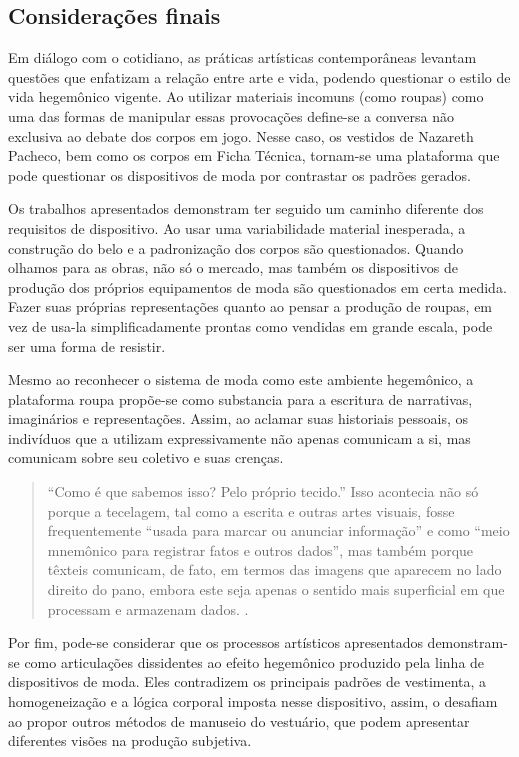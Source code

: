 \begin{refsection}
    \section{Considerações finais}

    Em diálogo com o cotidiano, as práticas artísticas contemporâneas levantam questões que enfatizam a relação entre arte e vida, podendo questionar o estilo de vida hegemônico vigente. Ao utilizar materiais incomuns (como roupas) como uma das formas de manipular essas provocações define-se a conversa não exclusiva ao debate dos corpos em jogo. Nesse caso, os vestidos de Nazareth Pacheco, bem como os corpos em Ficha Técnica, tornam-se uma plataforma que pode questionar os dispositivos de moda por contrastar os padrões gerados. 

    Os trabalhos apresentados demonstram ter seguido um caminho diferente dos requisitos de dispositivo. Ao usar uma variabilidade material inesperada, a construção do belo e a padronização dos corpos são questionados. Quando olhamos para as obras, não só o mercado, mas também os dispositivos de produção dos próprios equipamentos de moda são questionados em certa medida. Fazer suas próprias representações quanto ao pensar a produção de roupas, em vez de usa-la simplificadamente prontas como vendidas em grande escala, pode ser uma forma de resistir.  

    Mesmo ao reconhecer o sistema de moda como este ambiente hegemônico, a plataforma roupa propõe-se como substancia para a escritura de narrativas, imaginários e representações. Assim, ao aclamar suas historiais pessoais, os indivíduos que a utilizam expressivamente não apenas comunicam a si, mas comunicam sobre seu coletivo e suas crenças. 

    \begin{quotation}
        ``Como é que sabemos isso? Pelo próprio tecido.'' Isso acontecia não só porque a tecelagem, tal como a escrita e outras artes visuais, fosse frequentemente ``usada para marcar ou anunciar informação'' e como ``meio mnemônico para registrar fatos e outros dados'', mas também porque têxteis comunicam, de fato, em termos das imagens que aparecem no lado direito do pano, embora este seja apenas o sentido mais superficial em que processam e armazenam dados. \cite[p.~29]{Rago2013Aventura}.
    \end{quotation}

    Por fim, pode-se considerar que os processos artísticos apresentados demonstram-se como articulações dissidentes ao efeito hegemônico produzido pela linha de dispositivos de moda. Eles contradizem os principais padrões de vestimenta, a homogeneização e a lógica corporal imposta nesse dispositivo, assim, o desafiam ao propor outros métodos de manuseio do vestuário, que podem apresentar diferentes visões na produção subjetiva. 


\end{refsection}
